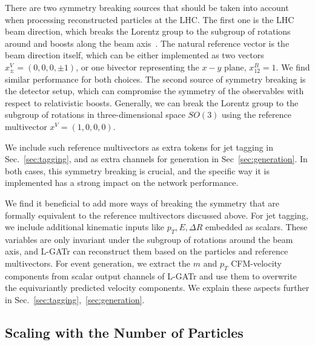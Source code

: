 \documentclass[submission, Phys]{SciPost}
\begin{document}
There are two symmetry breaking sources that should be taken into account when processing reconstructed particles at the LHC. The first one is the LHC beam direction, which breaks the Lorentz group to the subgroup of rotations around and boosts along the beam axis~\cite{Maitre:2024hzp,Bogatskiy:2023nnw, ruhe2023clifford, Gong:2022lye}. The natural reference vector is the beam direction itself, which can be either implemented as two vectors $x^V_\pm = (0,0,0,\pm 1)$, or one bivector representing the $x-y$ plane, $x^B_{12} = 1$. We find similar performance for both choices. The second source of symmetry breaking is the detector setup, which can compromise the symmetry of the observables with respect to relativistic boosts. Generally, we can break the Lorentz group to the subgroup of rotations in three-dimensional space $SO(3)$ using the reference multivector $x^V = (1,0,0,0)$. 

We include such reference multivectors as extra tokens for jet tagging in Sec.~\ref{sec:tagging}, and as extra channels for generation in Sec~\ref{sec:generation}. In both cases, this symmetry breaking is crucial, and the specific way it is implemented has a strong impact on the network performance.

We find it beneficial to add more ways of breaking the symmetry that are formally equivalent to the reference multivectors discussed above. For jet tagging, we include additional kinematic inputs like $p_T, E, \Delta R$ embedded as scalars. These variables are only invariant under the subgroup of rotations around the beam axis, and L-GATr can reconstruct them based on the particles and reference multivectors. For event generation, we extract the $m$ and $p_T$ CFM-velocity components from scalar output channels of L-GATr and use them to overwrite the equivariantly predicted velocity components. We explain these aspects further in Sec.~\ref{sec:tagging},~\ref{sec:generation}.

\subsection{Scaling with the Number of Particles}
\end{document}
